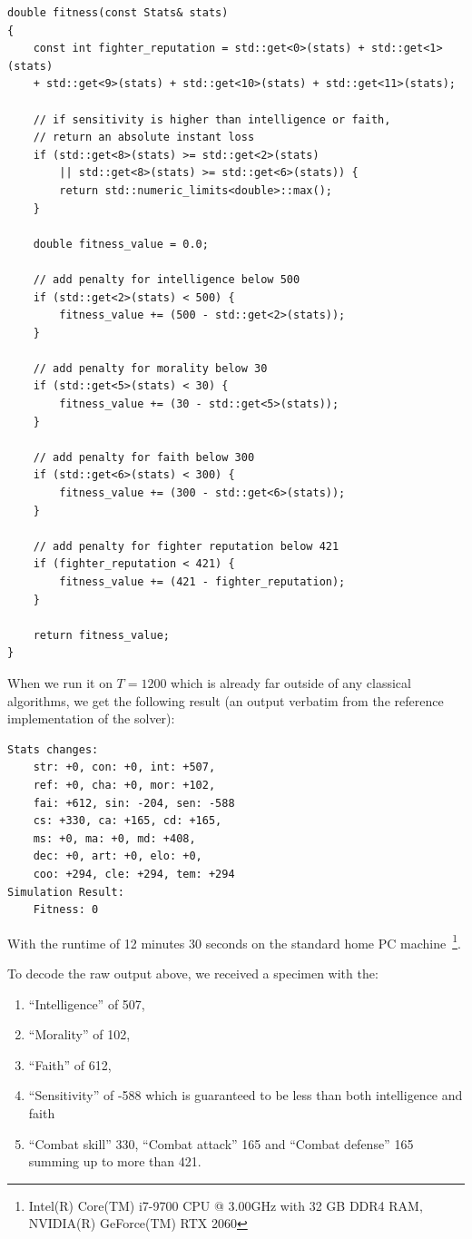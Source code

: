 \documentclass[12pt, a4paper]{report}
\begin{document}
\begin{lstlisting}[label=fitness-general]
double fitness(const Stats& stats)
{
	const int fighter_reputation = std::get<0>(stats) + std::get<1>(stats)
	+ std::get<9>(stats) + std::get<10>(stats) + std::get<11>(stats);
	
	// if sensitivity is higher than intelligence or faith,
	// return an absolute instant loss
	if (std::get<8>(stats) >= std::get<2>(stats) 
		|| std::get<8>(stats) >= std::get<6>(stats)) {
		return std::numeric_limits<double>::max();
	}
	
	double fitness_value = 0.0;
	
	// add penalty for intelligence below 500
	if (std::get<2>(stats) < 500) {
		fitness_value += (500 - std::get<2>(stats));
	}
	
	// add penalty for morality below 30
	if (std::get<5>(stats) < 30) {
		fitness_value += (30 - std::get<5>(stats));
	}
	
	// add penalty for faith below 300
	if (std::get<6>(stats) < 300) {
		fitness_value += (300 - std::get<6>(stats));
	}
	
	// add penalty for fighter reputation below 421
	if (fighter_reputation < 421) {
		fitness_value += (421 - fighter_reputation);
	}
	
	return fitness_value;
}
\end{lstlisting}	

	When we run it on $T=1200$ which is already far outside of any classical algorithms, we get the following result (an output verbatim from the reference implementation of the solver):
	
	\begin{verbatim}
Stats changes:
	str: +0, con: +0, int: +507,
	ref: +0, cha: +0, mor: +102,
	fai: +612, sin: -204, sen: -588
	cs: +330, ca: +165, cd: +165,
	ms: +0, ma: +0, md: +408,
	dec: +0, art: +0, elo: +0,
	coo: +294, cle: +294, tem: +294
Simulation Result:
	Fitness: 0
	\end{verbatim}

	With the runtime of 12 minutes 30 seconds on the standard home PC machine~\footnote{Intel(R) Core(TM) i7-9700 CPU @ 3.00GHz with 32 GB DDR4 RAM, NVIDIA(R) GeForce(TM) RTX 2060}.
	
	To decode the raw output above, we received a specimen with the:
	\begin{enumerate}
		\item ``Intelligence'' of 507,
		\item ``Morality'' of 102,
		\item ``Faith'' of 612,
		\item ``Sensitivity'' of -588 which is guaranteed to be less than both intelligence and faith
		\item ``Combat skill'' 330, ``Combat attack'' 165 and ``Combat defense'' 165 summing up to more than 421.
	\end{enumerate} 
	
\end{document}
